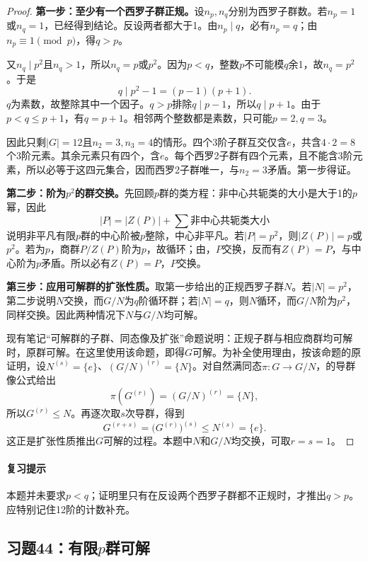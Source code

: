 
\begin{proof}
\textbf{第一步：至少有一个西罗子群正规。}设$n_p,n_q$分别为西罗子群数。若$n_p=1$或$n_q=1$，已经得到结论。反设两者都大于1。由$n_p\mid q$，必有$n_p=q$；由$n_p\equiv1\pmod p$，得$q>p$。

又$n_q\mid p^2$且$n_q>1$，所以$n_q=p$或$p^2$。因为$p<q$，整数$p$不可能模$q$余1，故$n_q=p^2$。于是
\[
q\mid p^2-1=(p-1)(p+1).
\]
$q$为素数，故整除其中一个因子。$q>p$排除$q\mid p-1$，所以$q\mid p+1$。由于$p<q\le p+1$，有$q=p+1$。相邻两个整数都是素数，只可能$p=2,q=3$。

因此只剩$|G|=12$且$n_2=3,n_3=4$的情形。四个3阶子群互交仅含$e$，共含$4\cdot2=8$个3阶元素。其余元素只有四个，含$e$。每个西罗2子群有四个元素，且不能含3阶元素，所以必等于这四元集合，因而西罗2子群唯一，与$n_2=3$矛盾。第一步得证。

\textbf{第二步：阶为$p^2$的群交换。}先回顾$p$群的类方程：非中心共轭类的大小是大于1的$p$幂，因此
\[
|P|=|Z(P)|+\sum\text{非中心共轭类大小}
\]
说明非平凡有限$p$群的中心阶被$p$整除，中心非平凡。若$|P|=p^2$，则$|Z(P)|=p$或$p^2$。若为$p$，商群$P/Z(P)$阶为$p$，故循环；由，$P$交换，反而有$Z(P)=P$，与中心阶为$p$矛盾。所以必有$Z(P)=P$，$P$交换。

\textbf{第三步：应用可解群的扩张性质。}取第一步给出的正规西罗子群$N$。若$|N|=p^2$，第二步说明$N$交换，而$G/N$为$q$阶循环群；若$|N|=q$，则$N$循环，而$G/N$阶为$p^2$，同样交换。因此两种情况下$N$与$G/N$均可解。

现有笔记“可解群的子群、同态像及扩张”命题说明：正规子群与相应商群均可解时，原群可解。在这里使用该命题，即得$G$可解。为补全使用理由，按该命题的原证明，设$N^{(s)}=\{e\}$、$(G/N)^{(r)}=\{N\}$。对自然满同态$\pi:G\to G/N$，的导群像公式给出
\[
\pi(G^{(r)})=(G/N)^{(r)}=\{N\},
\]
所以$G^{(r)}\le N$。再逐次取$s$次导群，得到
\[
G^{(r+s)}=\bigl(G^{(r)}\bigr)^{(s)}\le N^{(s)}=\{e\}.
\]
这正是扩张性质推出$G$可解的过程。本题中$N$和$G/N$均交换，可取$r=s=1$。
\end{proof}

\paragraph{复习提示}
本题并未要求$p<q$；证明里只有在反设两个西罗子群都不正规时，才推出$q>p$。应特别记住12阶的计数补充。


\subsection{习题44：\texorpdfstring{有限$p$群可解}{有限p群可解}}
\label{ex:2:44}

